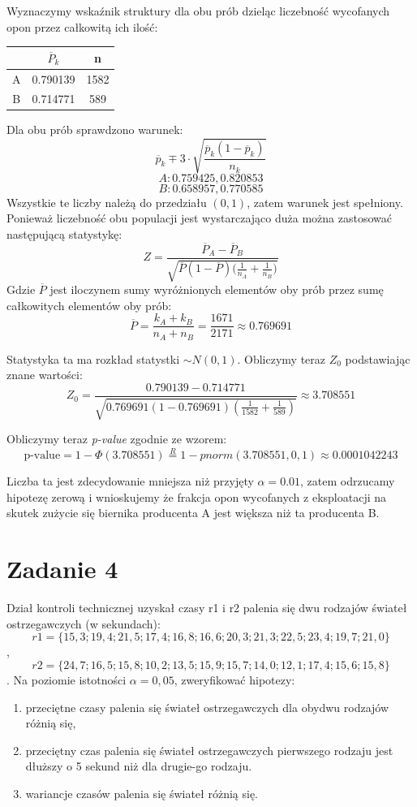 \documentclass{article}
\begin{document}
Wyznaczymy wskaźnik struktury dla obu prób dzieląc liczebność wycofanych opon przez całkowitą ich ilość:
\begin{center} \begin{tabular}{|c|c|c|} \hline
& $\overline{P}_k$ & n \\ \hline 
A & 0.790139 & 1582 \\ \hline
B & 0.714771 & 589 \\ \hline
\end{tabular} \end{center}

Dla obu prób sprawdzono warunek:
\[ \overline{p}_k \mp 3 \cdot \sqrt{ \frac{\overline{p}_k(1 - \overline{p}_k)}{n_k} } \]
\[ A : 0.759425 , 0.820853 \]
\[ B : 0.658957, 0.770585 \]
Wszystkie te liczby należą do przedziału $(0,1)$, zatem warunek jest spełniony.
Ponieważ liczebność obu populacji jest wystarczająco duża można zastosować następującą statystykę:
\[ Z = \frac{\overline{P}_A - \overline{P}_B}{ \sqrt{\overline{P}(1 - \overline{P}) \big( \frac{1}{n_A} + \frac{1}{n_B} \big)} } \]
Gdzie $\overline{P}$ jest iloczynem sumy wyróżnionych elementów oby prób przez sumę całkowitych elementów oby prób:
\[ \overline{P} = \frac{k_A + k_B}{n_A + n_B} = \frac{1671}{2171} \approx 0.769691 \]

Statystyka ta ma rozkład statystki $\sim N(0,1)$. Obliczymy teraz $Z_0$ podstawiając znane wartości:
\[ Z_0 = \frac{0.790139 - 0.714771}{ \sqrt{ 0.769691 (1 -  0.769691 ) (\frac{1}{1582} + \frac{1}{589}) } } \approx 3.708551 \]

Obliczymy teraz \textit{p-value} zgodnie ze wzorem:
\[ \text{p-value} = 1 - \Phi(3.708551) \overset{R}{=} 1 - pnorm(3.708551, 0, 1) \approx 0.0001042243 \]

Liczba ta jest zdecydowanie mniejsza niż przyjęty $\alpha = 0.01$, zatem odrzucamy hipotezę zerową i wnioskujemy że frakcja opon wycofanych z eksploatacji na skutek zużycie się biernika producenta A jest większa niż ta producenta B.

\newpage
\section{Zadanie 4}
Dział kontroli technicznej uzyskał czasy r1 i r2 palenia się dwu rodzajów świateł ostrzegawczych (w sekundach):
\[ r1 = \{15,3; 19,4; 21,5; 17,4; 16,8; 16,6; 20,3; 21,3; 22,5; 23,4; 19,7; 21,0\} \],
\[ r2 = \{24,7; 16,5; 15,8; 10,2; 13,5; 15,9; 15,7; 14,0; 12,1; 17,4; 15,6; 15,8\}\].
Na poziomie istotności $\alpha = 0,05$, zweryfikować hipotezy:
\begin{enumerate}[label = \alph*)]
\item przeciętne czasy palenia się świateł ostrzegawczych dla obydwu rodzajów różnią się,
\item przeciętny czas palenia się świateł ostrzegawczych pierwszego rodzaju jest dłuższy o 5 sekund niż dla drugie-go rodzaju.
\item wariancje czasów palenia się świateł różnią się.
\end{enumerate}
\end{document}
